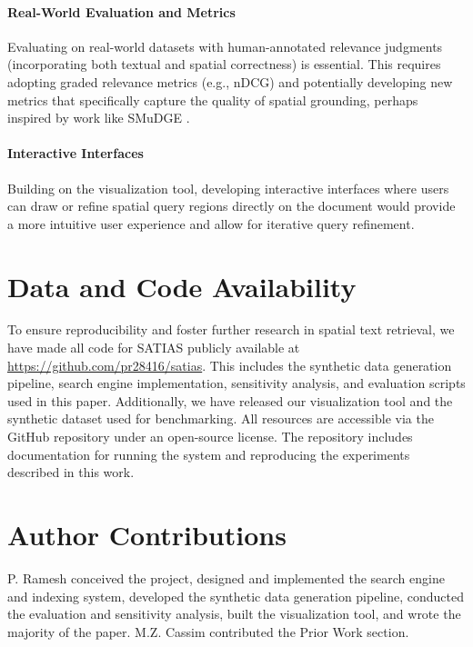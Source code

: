 \documentclass[sigconf,screen]{acmart}
\begin{document}
\paragraph{Real-World Evaluation and Metrics}
Evaluating on real-world datasets with human-annotated relevance judgments (incorporating both textual and spatial correctness) is essential. This requires adopting graded relevance metrics (e.g., nDCG) and potentially developing new metrics that specifically capture the quality of spatial grounding, perhaps inspired by work like SMuDGE \cite{Nguyen25}.

\paragraph{Interactive Interfaces}
Building on the visualization tool, developing interactive interfaces where users can draw or refine spatial query regions directly on the document would provide a more intuitive user experience and allow for iterative query refinement.

\section{Data and Code Availability}
To ensure reproducibility and foster further research in spatial text retrieval, we have made all code for SATIAS publicly available at \url{https://github.com/pr28416/satias}. This includes the synthetic data generation pipeline, search engine implementation, sensitivity analysis, and evaluation scripts used in this paper. Additionally, we have released our visualization tool and the synthetic dataset used for benchmarking. All resources are accessible via the GitHub repository under an open-source license. The repository includes documentation for running the system and reproducing the experiments described in this work.

\section*{Author Contributions}
P. Ramesh conceived the project, designed and implemented the search engine and indexing system, developed the synthetic data generation pipeline, conducted the evaluation and sensitivity analysis, built the visualization tool, and wrote the majority of the paper. M.Z. Cassim contributed the Prior Work section.

\begin{acks}

\end{acks}



\end{document}
